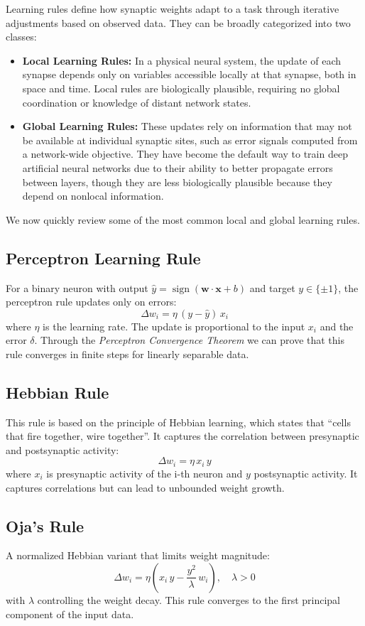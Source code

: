 \documentclass[a4paper,12pt]{report}
\begin{document}
Learning rules define how synaptic weights adapt to a task through iterative 
adjustments based on observed data.
They can be broadly categorized into two classes:
\begin{itemize}
\item \textbf{Local Learning Rules:} In a physical neural system, the update of each 
synapse depends only on variables accessible locally at that synapse, both in space 
and time\cite[Chapter~7]{Baldi2021}.
Local rules are biologically plausible, requiring no global coordination or knowledge 
of distant network states.
\item \textbf{Global Learning Rules:} These updates rely on information that may not 
be available at individual synaptic sites, such as error signals computed from a 
network-wide objective. They have become the default way to train deep artificial 
neural networks due to their ability to better propagate errors between layers, 
though they are less biologically plausible because they depend on nonlocal 
information.
\end{itemize}

We now quickly review some of the most common local and global learning rules.
\subsection*{Perceptron Learning Rule}
For a binary neuron with output 
$\hat y=\operatorname{sign}(\mathbf{w}\cdot\mathbf{x}+b)$ and target $y\in\{\pm1\}$, 
the perceptron rule updates only on errors:
\[
  \Delta w_i = \eta\,\left(y - \hat y\right)\,x_i
\]
where $\eta$ is the learning rate. The update is proportional to the input $x_i$ and 
the error $\delta$. Through the \emph{Perceptron Convergence Theorem} we can prove 
that this rule converges in finite steps for linearly separable data.

\subsection*{Hebbian Rule}
This rule is based on the principle of Hebbian learning, which states that 
``cells that fire together, wire together''. It captures the correlation between 
presynaptic and postsynaptic activity:
\[
  \Delta w_i = \eta\,x_i\,y
\]
where $x_i$ is presynaptic activity of the i-th neuron and $y$ postsynaptic activity. 
It captures correlations but can lead to unbounded weight growth.

\subsection*{Oja's Rule}
A normalized Hebbian variant that limits weight magnitude:
\[
  \Delta w_i = \eta \left(x_i\,y - \frac{y^2}{\lambda}\,w_i\right),\quad \lambda>0
\]
with $\lambda$ controlling the weight decay. This rule converges to the first 
principal component of the input data.
\end{document}
